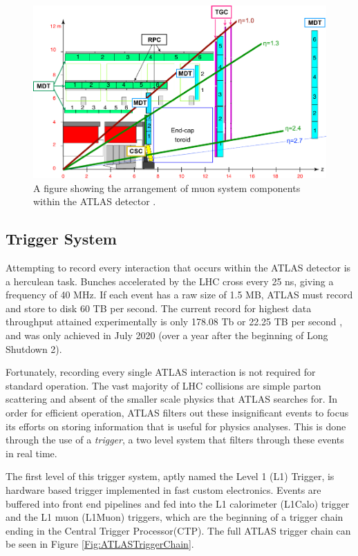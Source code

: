 \documentclass[12pt,a4paper,epsf,portrait,times,epsfig]{report}
\begin{document}
		\begin{figure}
			\centering
			\includegraphics[scale=1.5]{Muon_schematic_transp}
			\caption{A figure showing the arrangement of muon system components within the ATLAS detector \cite{ATLASTriggerImage}.}
			\label{Fig:MuonSystemLayout}
		\end{figure}


		\subsection{Trigger System}

		Attempting to record every interaction that occurs within the ATLAS detector is a herculean task. Bunches accelerated by the LHC cross every 25 ns, giving a frequency of 40 MHz. If each event has a raw size of 1.5 MB, ATLAS must record and store to disk 60 TB per second. The current record for highest data throughput attained experimentally is only 178.08 Tb or 22.25 TB per second \cite{UCLThroughput}, and was only achieved in July 2020 (over a year after the beginning of Long Shutdown 2). \par

		Fortunately, recording every single ATLAS interaction is not required for standard operation. The vast majority of LHC collisions are simple parton scattering and absent of the smaller scale physics that ATLAS searches for. In order for efficient operation, ATLAS filters out these insignificant events to focus its efforts on storing information that is useful for physics analyses. This is done through the use of a \textit{trigger}, a two level system that filters through these events in real time. \par

		The first level of this trigger system, aptly named the Level 1 (L1) Trigger, is hardware based trigger implemented in fast custom electronics. Events are buffered into front end pipelines and fed into the L1 calorimeter (L1Calo) trigger and the L1 muon (L1Muon) triggers, which are the beginning of a trigger chain ending in the Central Trigger Processor(CTP). The full ATLAS trigger chain can be seen in Figure \ref{Fig:ATLASTriggerChain}. \par
\end{document}
